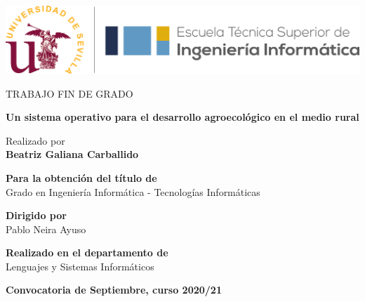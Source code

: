 \begin{center}

\vspace*{1cm}

\includegraphics[width=\textwidth]{fig/etsii_us.png}

\vspace*{3cm}
\begin{large}
TRABAJO FIN DE GRADO
\end{large}

\vspace*{0.1in}
\textbf{\huge Un sistema operativo para el desarrollo agroecológico en el medio rural} %

\vspace*{.2in}

{\large Realizado por}\\
\textbf{\Large Beatriz Galiana Carballido} %

\vspace*{3cm}

\textbf{Para la obtención del título de}\\
{\large Grado en Ingeniería Informática - Tecnologías Informáticas} %

\vspace*{0.2in}

\textbf{Dirigido por}\\
{\large Pablo Neira Ayuso}\\ %

\vspace*{0.2in}

\textbf{Realizado en el departamento de}\\
{\large Lenguajes y Sistemas Informáticos}

\vspace*{.6in}
\textbf{\Large Convocatoria de Septiembre, curso 2020/21} %

\end{center}


\thispagestyle{empty} %
\clearpage\setcounter{page}{1} %
